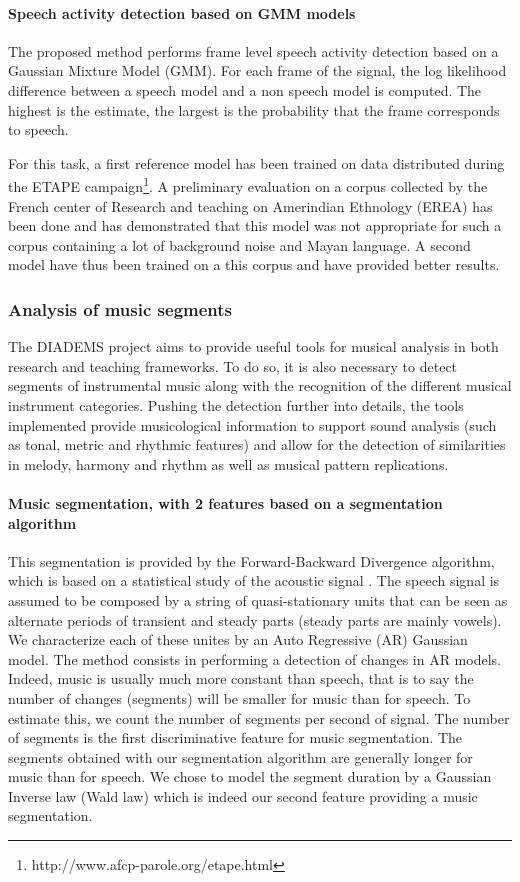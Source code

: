 \documentclass{sig-alternate}
\newcommand{\squeezeup}{\vspace{-2.5mm}}
\begin{document}
\squeezeup\paragraph{Speech activity detection based on GMM models}

The proposed method performs frame level speech activity detection based on a Gaussian Mixture Model (GMM). For each frame of the signal, the log likelihood difference between a speech model and a non speech model is computed.
The highest is the estimate, the largest is the probability that the frame corresponds to speech. 

For this task, a first reference model has been trained on data distributed during the ETAPE campaign\footnote{http://www.afcp-parole.org/etape.html}. A preliminary evaluation on a corpus collected by the French center of Research and teaching on Amerindian Ethnology (EREA) has been done and has demonstrated that this model was not appropriate for such a corpus containing a lot of background noise and Mayan language.
A second model have thus been trained on a this corpus and have provided better results.

\subsubsection{Analysis of music segments}
The DIADEMS project aims to provide useful tools for musical analysis in both research and teaching frameworks. To do so, it is also necessary to detect segments of instrumental music along with the recognition of the different musical instrument categories. Pushing the detection further into details, the tools implemented provide musicological information to support sound analysis (such as tonal, metric and rhythmic features) and allow for the detection of similarities in melody, harmony and rhythm as well as musical pattern replications.

\squeezeup\paragraph{Music segmentation, with 2 features based on a segmentation algorithm} 
This segmentation is provided by the Forward-Backward Divergence algorithm, which is based on a statistical study of the acoustic signal \cite{Obrecht1988}. The speech signal is assumed to be composed by a string of quasi-stationary units that can be seen as alternate periods of transient and steady parts (steady parts are mainly vowels). We characterize  each of these unites by an Auto Regressive (AR) Gaussian model. The method consists in performing a detection of changes in AR models. Indeed, music is usually much more constant than speech, that is to say the number of changes (segments) will be smaller for music than for speech. To estimate this, we count the number of segments per second of signal. The number of segments is the first discriminative feature for music segmentation.
The segments obtained with our segmentation algorithm  are generally longer for music than for speech. We chose to model the segment duration by a Gaussian Inverse law (Wald law) which is indeed our second feature providing a music segmentation.
\end{document}
